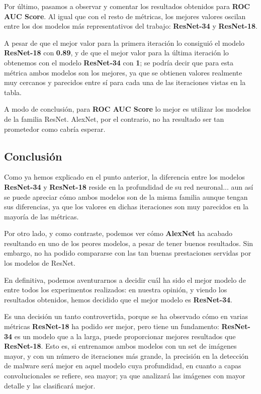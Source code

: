 Por último, pasamos a observar y comentar los resultados obtenidos para \textbf{ROC AUC Score}. Al igual que con el resto de métricas, los mejores valores oscilan entre los dos modelos más representativos del trabajo: \textbf{ResNet-34} y \textbf{ResNet-18}.

A pesar de que el mejor valor para la primera iteración lo consiguió el modelo \textbf{ResNet-18} con \textbf{0.89}, y de que el mejor valor para la última iteración lo obtenemos con el modelo \textbf{ResNet-34} con \textbf{1}; se podría decir que para esta métrica ambos modelos son los mejores, ya que se obtienen valores realmente muy cercanos y parecidos entre sí para cada una de las iteraciones vistas en la tabla.

A modo de conclusión, para \textbf{ROC AUC Score} lo mejor es utilizar los modelos de la familia ResNet. AlexNet, por el contrario, no ha resultado ser tan prometedor como cabría esperar.

\subsection{Conclusión}

Como ya hemos explicado en el punto anterior, la diferencia entre los modelos \textbf{ResNet-34} y \textbf{ResNet-18} reside en la profundidad de su red neuronal... aun así se puede apreciar cómo ambos modelos son de la misma familia aunque tengan sus diferencias, ya que los valores en dichas iteraciones son muy parecidos en la mayoría de las métricas.

Por otro lado, y como contraste, podemos ver cómo \textbf{AlexNet} ha acabado resultando en uno de los peores modelos, a pesar de tener buenos resultados. Sin embargo, no ha podido compararse con las tan buenas prestaciones servidas por los modelos de ResNet.

En definitiva, podemos aventurarnos a decidir cuál ha sido el mejor modelo de entre todos los experimentos realizados: en nuestra opinión, y viendo los resultados obtenidos, hemos decidido que el mejor modelo es \textbf{ResNet-34}.

Es una decisión un tanto controvertida, porque se ha observado cómo en varias métricas \textbf{ResNet-18} ha podido ser mejor, pero tiene un fundamento: \textbf{ResNet-34} es un modelo que a la larga, puede proporcionar mejores resultados que \textbf{ResNet-18}. Esto es, si entrenamos ambos modelos con un set de imágenes mayor, y con un número de iteraciones más grande, la precisión en la detección de malware será mejor en aquel modelo cuya profundidad, en cuanto a capas convolucionales se refiere, sea mayor; ya que analizará las imágenes con mayor detalle y las clasificará mejor.

